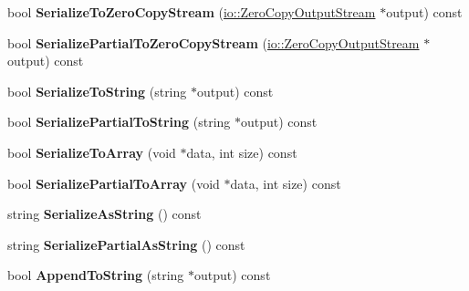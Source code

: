 \begin{DoxyCompactItemize}
bool {\bfseries Serialize\+To\+Zero\+Copy\+Stream} (\hyperlink{classgoogle_1_1protobuf_1_1io_1_1ZeroCopyOutputStream}{io\+::\+Zero\+Copy\+Output\+Stream} $\ast$output) const
\item 
\mbox{\label{classgoogle_1_1protobuf_1_1MessageLite_ac3fafe2b3f586499db6e4ee1b894c1a2}} 
bool {\bfseries Serialize\+Partial\+To\+Zero\+Copy\+Stream} (\hyperlink{classgoogle_1_1protobuf_1_1io_1_1ZeroCopyOutputStream}{io\+::\+Zero\+Copy\+Output\+Stream} $\ast$output) const
\item 
\mbox{\label{classgoogle_1_1protobuf_1_1MessageLite_a1db22aed4fd39a186e42aa583ac9264d}} 
bool {\bfseries Serialize\+To\+String} (string $\ast$output) const
\item 
\mbox{\label{classgoogle_1_1protobuf_1_1MessageLite_a61fe248b66fcade253a1677d5e2b246d}} 
bool {\bfseries Serialize\+Partial\+To\+String} (string $\ast$output) const
\item 
\mbox{\label{classgoogle_1_1protobuf_1_1MessageLite_ac4dece40d7a9f9a21c05cb31d9e9a45f}} 
bool {\bfseries Serialize\+To\+Array} (void $\ast$data, int size) const
\item 
\mbox{\label{classgoogle_1_1protobuf_1_1MessageLite_a36c5a45c4c0fc1a1f573a435d599f00f}} 
bool {\bfseries Serialize\+Partial\+To\+Array} (void $\ast$data, int size) const
\item 
\mbox{\label{classgoogle_1_1protobuf_1_1MessageLite_aba9cd64fdcbe0621f5580126f83a18ca}} 
string {\bfseries Serialize\+As\+String} () const
\item 
\mbox{\label{classgoogle_1_1protobuf_1_1MessageLite_a85047fbf38c66cdf1d15b5be88de8270}} 
string {\bfseries Serialize\+Partial\+As\+String} () const
\item 
\mbox{\label{classgoogle_1_1protobuf_1_1MessageLite_a0ea9182f23025379e2db56db68859fd3}} 
bool {\bfseries Append\+To\+String} (string $\ast$output) const

\end{DoxyCompactItemize}
